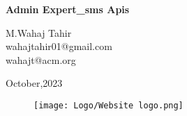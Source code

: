 \begin{Titlepage}
\begin{center}
    \vspace*{2cm}
    
    \textbf{\Huge Admin Expert\_sms Apis}\\
    \vspace*{2cm}
    
      
      \vspace{0.2cm}
      \begin{center}
          \large M.Wahaj Tahir\\wahajtahir01@gmail.com\\wahajt@acm.org
      \end{center} 
    
    \vspace{1.5cm}
    \begin{center}
    \large October,2023 
    \end{center}
    
    \vfill
    \vspace{0.8cm}
    \begin{figure}[hb]
        \centering
        \texttt{[image: Logo/Website logo.png]}
    \end{figure}
    \end{center}
\end{Titlepage}








